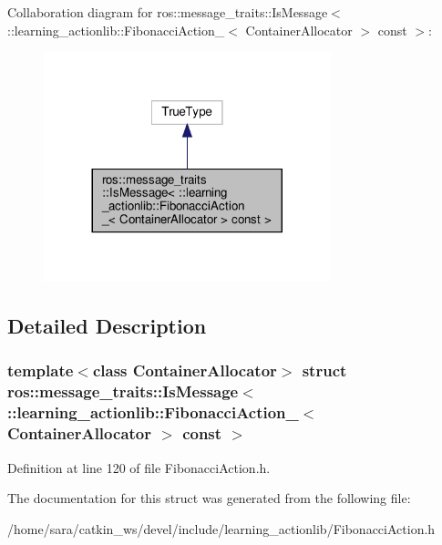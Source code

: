 Collaboration diagram for ros\+:\+:message\+\_\+traits\+:\+:Is\+Message$<$ \+:\+:learning\+\_\+actionlib\+:\+:Fibonacci\+Action\+\_\+$<$ Container\+Allocator $>$ const $>$\+:
\nopagebreak
\begin{figure}[H]
\begin{center}
\leavevmode
\includegraphics[width=236pt]{structros_1_1message__traits_1_1IsMessage_3_01_1_1learning__actionlib_1_1FibonacciAction___3_01C444d244bb5b04ba52d0912ddaf1d0dc4}
\end{center}
\end{figure}


\subsection{Detailed Description}
\subsubsection*{template$<$class Container\+Allocator$>$\newline
struct ros\+::message\+\_\+traits\+::\+Is\+Message$<$ \+::learning\+\_\+actionlib\+::\+Fibonacci\+Action\+\_\+$<$ Container\+Allocator $>$ const $>$}



Definition at line 120 of file Fibonacci\+Action.\+h.



The documentation for this struct was generated from the following file\+:\begin{DoxyCompactItemize}
\item 
/home/sara/catkin\+\_\+ws/devel/include/learning\+\_\+actionlib/Fibonacci\+Action.\+h\end{DoxyCompactItemize}
